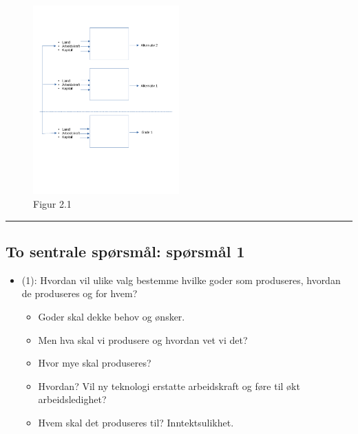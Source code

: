 \documentclass[
  letterpaper,
  DIV=11,
  numbers=noendperiod]{scrartcl}
\providecommand{\tightlist}{%
  \setlength{\itemsep}{0pt}\setlength{\parskip}{0pt}}\usepackage{longtable,booktabs,array}
\begin{document}
\begin{figure}[H]

{\centering \includegraphics[width=0.5\textwidth,height=\textheight]{utskrifter_files/mediabag/drawio/alternativ.pdf}

}

\caption{Figur 2.1}

\end{figure}%

\begin{center}\rule{0.5\linewidth}{0.5pt}\end{center}

\subsection{To sentrale spørsmål: spørsmål
1}\label{to-sentrale-spuxf8rsmuxe5l-spuxf8rsmuxe5l-1}

\begin{itemize}
\tightlist
\item
  (1): Hvordan vil ulike valg bestemme hvilke goder som produseres,
  hvordan de produseres og for hvem?

  \begin{itemize}
  \tightlist
  \item
    Goder skal dekke behov og ønsker.
  \item
    Men hva skal vi produsere og hvordan vet vi det?
  \item
    Hvor mye skal produseres?
  \item
    Hvordan? Vil ny teknologi erstatte arbeidskraft og føre til økt
    arbeidsledighet?
  \item
    Hvem skal det produseres til? Inntektsulikhet.
  \end{itemize}
\end{itemize}
\end{document}
